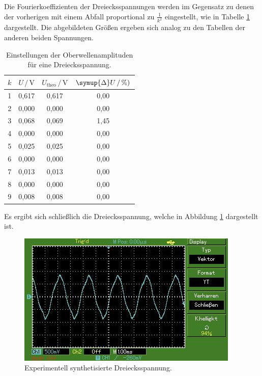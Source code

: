 Die Fourierkoeffizienten der Dreiecksspannungen werden im Gegensatz zu denen
der vorherigen mit einem Abfall proportional zu $\frac{1}{k^2}$ eingestellt,
wie in Tabelle \ref{tab:Messdaten6} dargestellt. Die abgebildeten
Größen ergeben sich analog zu den Tabellen der anderen beiden Spannungen.

\begin{table}[H]
    \centering
    \caption{Einstellungen der Oberwellenamplituden für eine Dreiecksspannung.}
    \label{tab:Messdaten6}
    \begin{tabular}{c c c c}
    \toprule
    $k$ & $U \,/\, \si{\volt}$ & $U_\text{theo} \,/\, \si{\volt}$ & $\symup{\Delta}U \,/\, \si{\percent})$ \\
    \midrule
    1 & 0,617 & 0,617 & 0,00 \\
    2 & 0,000 & 0,000 & 0,00 \\
    3 & 0,068 & 0,069 & 1,45 \\
    4 & 0,000 & 0,000 & 0,00 \\
    5 & 0,025 & 0,025 & 0,00 \\
    6 & 0,000 & 0,000 & 0,00 \\
    7 & 0,013 & 0,013 & 0,00 \\
    8 & 0,000 & 0,000 & 0,00 \\
    9 & 0,008 & 0,008 & 0,00 \\
    \bottomrule
    \end{tabular}
\end{table}

Es ergibt sich schließlich die Dreiecksspannung, welche in Abbildung \ref{fig:Ex3}
dargestellt ist.

\begin{figure}[H]
    \centering
    \includegraphics[scale=0.7]{content/sinus.jpg}
    \caption{Experimentell synthetisierte Dreiecksspannung.}
    \label{fig:Ex3}
\end{figure}




